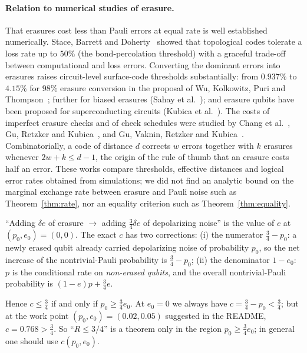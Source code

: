 \paragraph{Relation to numerical studies of erasure.}
That erasures cost less than Pauli errors at equal rate is well established numerically. Stace, Barrett and Doherty~\cite{SBD} showed that topological codes tolerate a loss rate up to $50\%$ (the bond-percolation threshold) with a graceful trade-off between computational and loss errors.
Converting the dominant errors into erasures raises circuit-level surface-code thresholds substantially: from $0.937\%$ to $4.15\%$ for $98\%$ erasure conversion in the proposal of Wu, Kolkowitz, Puri and Thompson~\cite{WKPT}; further for biased erasures (Sahay et al.~\cite{Sahay}); and erasure qubits have been proposed for superconducting circuits (Kubica et al.~\cite{KubicaErasure}). The costs of imperfect erasure checks and of check schedules were studied by Chang et al.~\cite{Chang}, Gu, Retzker and Kubica~\cite{GRK}, and Gu, Vaknin, Retzker and Kubica~\cite{GVRK}.
Combinatorially, a code of distance $d$ corrects $w$ errors together with $k$ erasures whenever $2w+k\le d-1$, the origin of the rule of thumb that an erasure costs half an error.
These works compare thresholds, effective distances and logical error rates obtained from simulations; we did not find an analytic bound on the marginal exchange rate between erasure and Pauli noise such as Theorem~\ref{thm:rate}, nor an equality criterion such as Theorem~\ref{thm:equality}.

\begin{remark}\label{rem:34}
``Adding $\delta e$ of erasure $\to$ adding $\tfrac34\delta e$ of depolarizing noise'' is the value of $c$ at $(p_0,e_0)=(0,0)$. The exact $c$ has two corrections:
(i) the numerator $\tfrac34-p_0$: a newly erased qubit already carried depolarizing noise of probability $p_0$, so the net increase of the nontrivial-Pauli probability is $\tfrac34-p_0$;
(ii) the denominator $1-e_0$: $p$ is the conditional rate on \emph{non-erased qubits}, and the overall nontrivial-Pauli probability is $(1-e)p+\tfrac34 e$.

Hence $c\le\tfrac34$ if and only if $p_0\ge\tfrac34e_0$. At $e_0=0$ we always have $c=\tfrac34-p_0<\tfrac34$;
but at the work point $(p_0,e_0)=(0.02,0.05)$ suggested in the README, $c=0.768>\tfrac34$.
So ``$R\le3/4$'' is a theorem only in the region $p_0\ge\tfrac34e_0$; in general one should use $c(p_0,e_0)$.
\end{remark}

